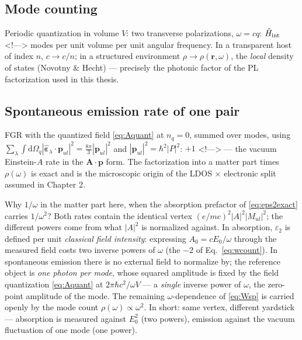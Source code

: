 \documentclass[11pt,a4paper]{article}
\numberwithin{equation}{section}
\begin{document}
\subsection{Mode counting}

Periodic quantization in volume $V$: two transverse polarizations,
$\omega=cq$:
$\hat H_{\rm int}$
<!--\label{eq:rhophot}-->
modes per unit volume per unit angular frequency.  In a transparent
host of index $n$, $c\to c/n$; in a structured environment
$\rho\to\rho(\mathbf r,\omega)$, the \emph{local} density of states
(Novotny \& Hecht) --- precisely the photonic factor of the PL
factorization used in this thesis.

\subsection{Spontaneous emission rate of one pair}

FGR with the quantized field \eqref{eq:Aquant} at $n_q=0$, summed over
modes, using
$\sum_\lambda\int{\mathrm{d}}\Omega_q|\hat{\bm{\varepsilon}}_\lambda\!\cdot\!{\mathbf{p}_{ul}}|^2
=\tfrac{8\pi}{3}|{\mathbf{p}_{ul}}|^2$ and $|{\mathbf{p}_{ul}}|^2=\hbar^2|P|^2$:
$+1$
<!--\label{eq:Wsp}-->
--- the vacuum Einstein-$A$ rate in the
$\mathbf A\!\cdot\!\mathbf p$ form.  The factorization into a matter
part times $\rho(\omega)$ is exact and is the microscopic origin of
the LDOS $\times$ electronic split assumed in Chapter 2.

Why $1/\omega$ in the matter part here, when the absorption prefactor
of \eqref{eq:eps2exact} carries $1/\omega^2$?  Both rates contain the
identical vertex $(e/mc)^2|A|^2|M_{ul}|^2$; the different powers come
from what $|A|^2$ is normalized against.  In absorption, ${\varepsilon}_2$ is
defined per unit \emph{classical field intensity}: expressing
$A_0=cE_0/\omega$ through the measured field costs two inverse powers
of $\omega$ (the $-2$ of Eq.~\eqref{eq:wcount}).  In spontaneous
emission there is no external field to normalize by; the reference
object is \emph{one photon per mode}, whose squared amplitude is fixed
by the field quantization \eqref{eq:Aquant} at $2\pi\hbar c^2/\omega
V$ --- a \emph{single} inverse power of $\omega$, the zero-point
amplitude of the mode.  The remaining $\omega$-dependence of
\eqref{eq:Wsp} is carried openly by the mode count
$\rho(\omega)\propto\omega^2$.  In short: same vertex, different
yardstick --- absorption is measured against $E_0^2$ (two powers),
emission against the vacuum fluctuation of one mode (one power).
\end{document}
